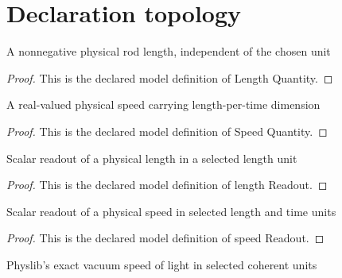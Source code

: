 \section{Declaration topology}
\begin{definition}
  \label{def:physics:phyx-mini-0526:phyxminiproblems-problemphyxmini0526-lengthquantity}
  A nonnegative physical rod length, independent of the chosen unit
\end{definition}
\begin{proof}
  This is the declared model definition of Length Quantity.
\end{proof}
\begin{definition}
  \label{def:physics:phyx-mini-0526:phyxminiproblems-problemphyxmini0526-speedquantity}
  A real-valued physical speed carrying length-per-time dimension
\end{definition}
\begin{proof}
  This is the declared model definition of Speed Quantity.
\end{proof}
\begin{definition}
  \label{def:physics:phyx-mini-0526:phyxminiproblems-problemphyxmini0526-lengthreadout}
  Scalar readout of a physical length in a selected length unit
\end{definition}
\begin{proof}
  This is the declared model definition of length Readout.
\end{proof}
\begin{definition}
  \label{def:physics:phyx-mini-0526:phyxminiproblems-problemphyxmini0526-speedreadout}
  Scalar readout of a physical speed in selected length and time units
\end{definition}
\begin{proof}
  This is the declared model definition of speed Readout.
\end{proof}
\begin{definition}
  \label{def:physics:phyx-mini-0526:phyxminiproblems-problemphyxmini0526-vacuumspeedoflightreadout}
  Physlib's exact vacuum speed of light in selected coherent units
\end{definition}
